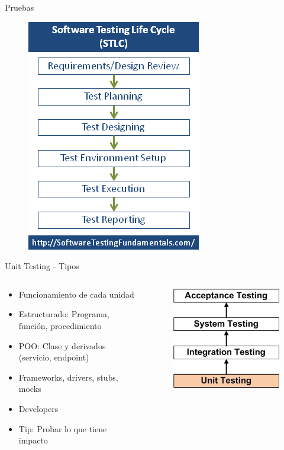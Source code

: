 \documentclass{beamer}
\begin{document}
\begin{frame}{Pruebas}
\begin{figure}
	\centering
	\includegraphics[width=0.4\linewidth]{Images/lifecycle}
\end{figure}
\end{frame}


\begin{frame}{Unit Testing - Tipos}
\begin{columns}[T]
\begin{column}[T]{6cm}
	\begin{itemize}
		\item Funcionamiento de cada unidad
		\item Estructurado: Programa, función, procedimiento
		\item POO: Clase y derivados (servicio, endpoint)
		\item Frameworks, drivers, stubs, mocks
		\item Developers
		\item Tip: Probar lo que tiene impacto
	\end{itemize}
\end{column}
\begin{column}[T]{4cm} %
	\begin{figure}
		\centering
		\includegraphics[width=0.8\linewidth]{Images/unittesting}
	\end{figure}
\end{column}
\end{columns}
\end{frame}
\end{document}
